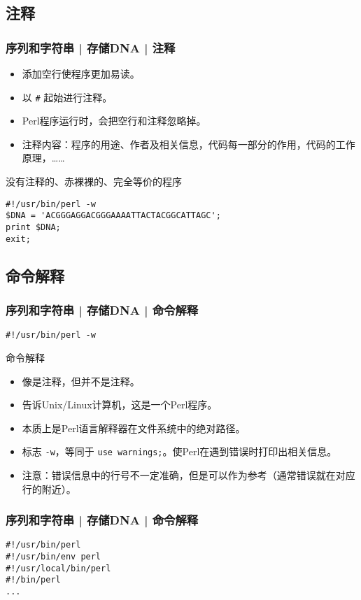 \subsection{注释}
\begin{frame}[fragile]
  \frametitle{序列和字符串 | 存储DNA | 注释}
  \begin{itemize}
    \item 添加空行使程序更加易读。
    \item 以 \verb|#| 起始进行注释。
    \item Perl程序运行时，会把空行和注释忽略掉。
    \item 注释内容：程序的用途、作者及相关信息，代码每一部分的作用，代码的工作原理，……
  \end{itemize}
  \pause
  \begin{block}{没有注释的、赤裸裸的、完全等价的程序}
\begin{lstlisting}
#!/usr/bin/perl -w
$DNA = 'ACGGGAGGACGGGAAAATTACTACGGCATTAGC';
print $DNA;
exit;
\end{lstlisting}
  \end{block}
\end{frame}

\subsection{命令解释}
\begin{frame}[fragile]
  \frametitle{序列和字符串 | 存储DNA | \alert{命令解释}}
\begin{lstlisting}
#!/usr/bin/perl -w
\end{lstlisting}
\pause
\begin{block}{命令解释}
  \begin{itemize}
    \item 像是注释，但并不是注释。
    \item 告诉Unix/Linux计算机，这是一个Perl程序。
    \item 本质上是Perl语言解释器在文件系统中的绝对路径。
    \item 标志 \verb|-w|，等同于 \verb|use warnings;|。使Perl在遇到错误时打印出相关信息。
    \item 注意：错误信息中的行号不一定准确，但是可以作为参考（通常错误就在对应行的附近）。
  \end{itemize}
\end{block}
\end{frame}

\begin{frame}[fragile]
  \frametitle{序列和字符串 | 存储DNA | 命令解释}
\begin{lstlisting}
#!/usr/bin/perl
#!/usr/bin/env perl
#!/usr/local/bin/perl
#!/bin/perl
...
\end{lstlisting}
\end{frame}

